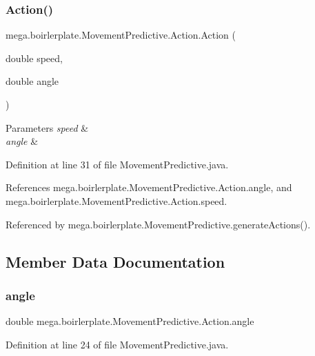 \subsubsection{\texorpdfstring{Action()}{Action()}}
{\footnotesize\ttfamily mega.\+boirlerplate.\+Movement\+Predictive.\+Action.\+Action (\begin{DoxyParamCaption}\item[{double}]{speed,  }\item[{double}]{angle }\end{DoxyParamCaption})}


\begin{DoxyParams}{Parameters}
{\em speed} & \\
\hline
{\em angle} & \\
\hline
\end{DoxyParams}


Definition at line 31 of file Movement\+Predictive.\+java.



References mega.\+boirlerplate.\+Movement\+Predictive.\+Action.\+angle, and mega.\+boirlerplate.\+Movement\+Predictive.\+Action.\+speed.



Referenced by mega.\+boirlerplate.\+Movement\+Predictive.\+generate\+Actions().



\subsection{Member Data Documentation}
\mbox{\label{classmega_1_1boirlerplate_1_1_movement_predictive_1_1_action_a49ee0d6b4ec3a6fdf11c2a9ac5e88585}} 
\subsubsection{\texorpdfstring{angle}{angle}}
{\footnotesize\ttfamily double mega.\+boirlerplate.\+Movement\+Predictive.\+Action.\+angle}



Definition at line 24 of file Movement\+Predictive.\+java.



